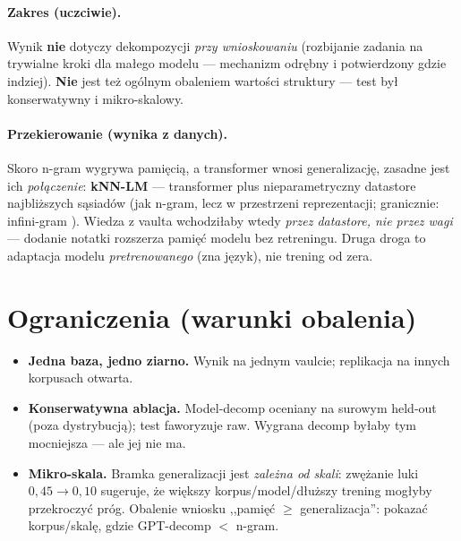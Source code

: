 \documentclass[11pt]{article}
\begin{document}
\paragraph{Zakres (uczciwie).} Wynik \textbf{nie} dotyczy dekompozycji \emph{przy wnioskowaniu} (rozbijanie zadania
na trywialne kroki dla małego modelu --- mechanizm odrębny i potwierdzony gdzie indziej). \textbf{Nie} jest też
ogólnym obaleniem wartości struktury --- test był konserwatywny i mikro-skalowy.

\paragraph{Przekierowanie (wynika z danych).} Skoro n-gram wygrywa pamięcią, a transformer wnosi generalizację,
zasadne jest ich \emph{połączenie}: \textbf{kNN-LM} \cite{knnlm} --- transformer plus nieparametryczny datastore
najbliższych sąsiadów (jak n-gram, lecz w przestrzeni reprezentacji; granicznie: infini-gram \cite{infinigram}).
Wiedza z vaulta wchodziłaby wtedy \emph{przez datastore, nie przez wagi} --- dodanie notatki rozszerza pamięć modelu
bez retreningu. Druga droga to adaptacja modelu \emph{pretrenowanego} (zna język), nie trening od zera.

\section{Ograniczenia (warunki obalenia)}
\begin{itemize}
  \item \textbf{Jedna baza, jedno ziarno.} Wynik na jednym vaulcie; replikacja na innych korpusach otwarta.
  \item \textbf{Konserwatywna ablacja.} Model-decomp oceniany na surowym held-out (poza dystrybucją); test
  faworyzuje raw. Wygrana decomp byłaby tym mocniejsza --- ale jej nie ma.
  \item \textbf{Mikro-skala.} Bramka generalizacji jest \emph{zależna od skali}: zwężanie luki $0{,}45\!\to\!0{,}10$
  sugeruje, że większy korpus/model/dłuższy trening mogłyby przekroczyć próg. Obalenie wniosku ,,pamięć $\geq$
  generalizacja'': pokazać korpus/skalę, gdzie GPT-decomp $<$ n-gram.
\end{itemize}
\end{document}
